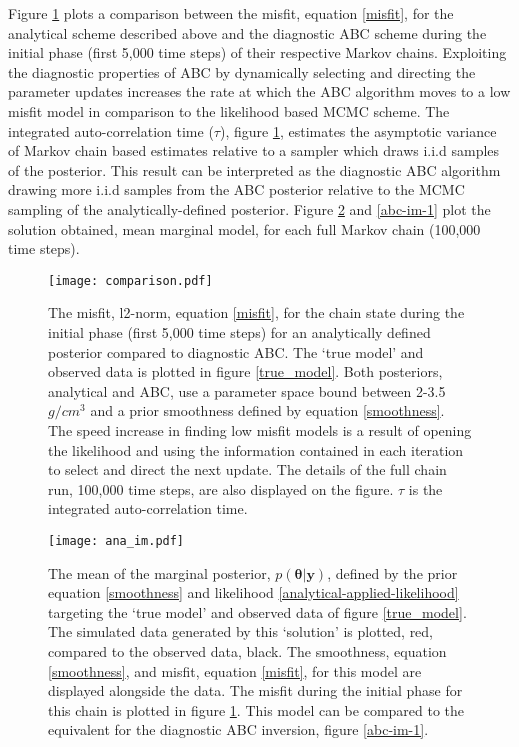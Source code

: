 Figure \ref{comparison-1} plots a comparison between the misfit, equation \ref{misfit}, for the analytical scheme described above and the diagnostic ABC scheme during the initial phase (first 5,000 time steps) of their respective Markov chains. Exploiting the diagnostic properties of ABC by dynamically selecting and directing the parameter updates increases the rate at which the ABC algorithm moves to a low misfit model in comparison to the likelihood based MCMC scheme. The integrated auto-correlation time ($\tau$), figure \ref{comparison-1}, estimates the asymptotic variance of Markov chain based estimates relative to a sampler which draws i.i.d samples of the posterior. This result can be interpreted as the diagnostic ABC algorithm drawing more i.i.d samples from the ABC posterior relative to the MCMC sampling of the analytically-defined posterior. Figure \ref{ana-im-1} and \ref{abc-im-1} plot the solution obtained, mean marginal model, for each full Markov chain (100,000 time steps). \par

\begin{figure}[H]
	\centering
	\texttt{[image: comparison.pdf]}
	\caption{The misfit, l2-norm, equation \ref{misfit}, for the chain state during the initial phase (first 5,000 time steps) for an analytically defined posterior compared to diagnostic ABC. The `true model' and observed data is plotted in figure \ref{true_model}. Both posteriors, analytical and ABC, use a parameter space bound between 2-3.5 $g/cm^3$ and a prior smoothness defined by equation \ref{smoothness}. The speed increase in finding low misfit models is a result of opening the likelihood and using the information contained in each iteration to select and direct the next update. The details of the full chain run, 100,000 time steps, are also displayed on the figure. $\tau$ is the integrated auto-correlation time.}
	\label{comparison-1}
\end{figure}

\begin{figure}[H]
	\centering
	\texttt{[image: ana\_im.pdf]}
	\caption{The mean of the marginal posterior, $p(\bm{\theta}|\bm{y})$, defined by the prior equation \ref{smoothness} and likelihood \ref{analytical-applied-likelihood} targeting the `true model' and observed data of figure \ref{true_model}. The simulated data generated by this `solution' is plotted, red, compared to the observed data, black. The smoothness, equation \ref{smoothness}, and misfit, equation \ref{misfit}, for this model are displayed alongside the data. The misfit during the initial phase for this chain is plotted in figure \ref{comparison-1}. This model can be compared to the equivalent for the diagnostic ABC inversion, figure \ref{abc-im-1}.}
	\label{ana-im-1}
\end{figure}

